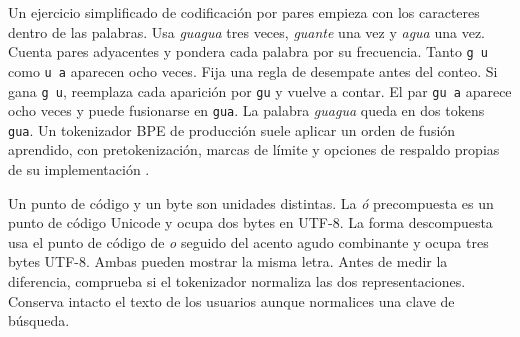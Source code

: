 {Un ejercicio simplificado de codificación por pares empieza con los caracteres dentro de las palabras. Usa \emph{guagua} tres veces, \emph{guante} una vez y \emph{agua} una vez. Cuenta pares adyacentes y pondera cada palabra por su frecuencia. Tanto \texttt{g u} como \texttt{u a} aparecen ocho veces. Fija una regla de desempate antes del conteo. Si gana \texttt{g u}, reemplaza cada aparición por \texttt{gu} y vuelve a contar. El par \texttt{gu a} aparece ocho veces y puede fusionarse en \texttt{gua}. La palabra \emph{guagua} queda en dos tokens \texttt{gua}. Un tokenizador BPE de producción suele aplicar un orden de fusión aprendido, con pretokenización, marcas de límite y opciones de respaldo propias de su implementación \citep{bpe}.}

{Un punto de código y un byte son unidades distintas. La \emph{ó} precompuesta es un punto de código Unicode y ocupa dos bytes en UTF-8. La forma descompuesta usa el punto de código de \emph{o} seguido del acento agudo combinante y ocupa tres bytes UTF-8. Ambas pueden mostrar la misma letra. Antes de medir la diferencia, comprueba si el tokenizador normaliza las dos representaciones. Conserva intacto el texto de los usuarios aunque normalices una clave de búsqueda.}

\section{}

